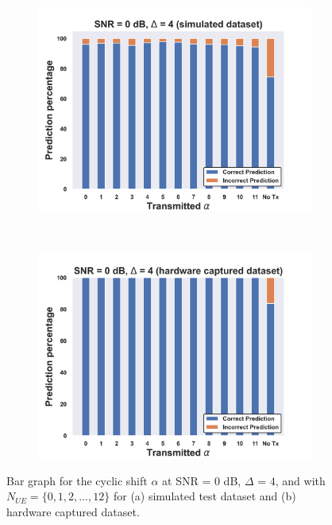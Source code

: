 \documentclass[journal]{IEEEtran}
\begin{document}
\begin{figure}[ht!]
    \captionsetup{justification=justified}
     \centering
     \begin{subfigure}[b]{0.48\textwidth}
         \centering
         \includegraphics[width=\textwidth]{Figures/Bar_alpha_SNR_SNR_0_dB_Max_off_4_train_sim_test_sim.png}
         \caption{}
         \label{fig: bar_alpha_SNR_snr_0_off_4_sim}
     \end{subfigure}
     \\
     \begin{subfigure}[b]{0.48\textwidth}
         \centering
         \includegraphics[width=\textwidth]{Figures/Bar_alpha_SNR_SNR_0_dB_Max_off_4_train_sim_test_hw.png}
         \caption{}
         \label{fig: bar_alpha_SNR_snr_0_off_4_hw}
     \end{subfigure}
        \caption{Bar graph for the cyclic shift $\alpha$ at SNR = $0$ dB, $\Delta$ = $4$, and with $N_{UE} = \{0, 1, 2, \dots, 12\}$ for (a) simulated test dataset and (b) hardware captured dataset.}
        \label{fig: bar_alpha_SNR_snr_0_off_4}
\end{figure}
\end{document}
